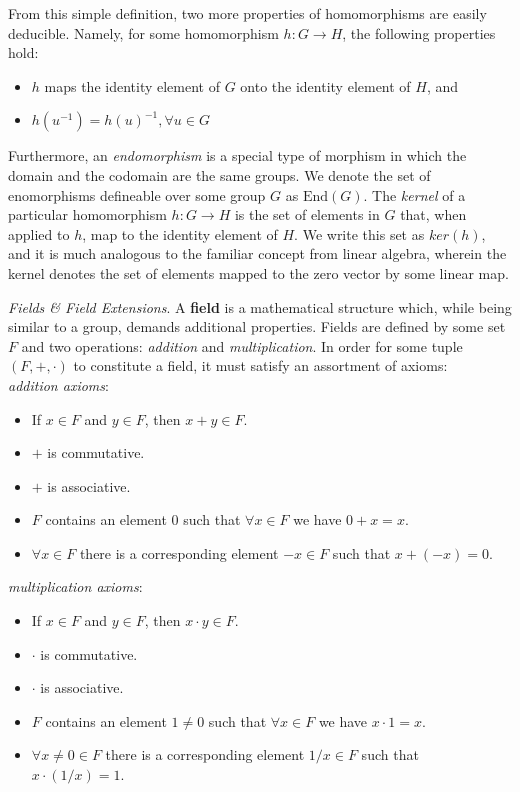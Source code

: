 From this simple definition, two more properties of homomorphisms are easily deducible. Namely, for some homomorphism $h: G \rightarrow H$, the following properties hold:
\begin{itemize}
\item $h$ maps the identity element of $G$ onto the identity element of $H$, and
\item $h(u^{-1}) = h(u)^{-1}, \forall u \in G$
\end{itemize}

Furthermore, an \emph{endomorphism} is a special type of morphism in which the domain and the codomain are the same groups. We denote the set of enomorphisms defineable over some group $G$ as $\text{End}(G)$.
The \emph{kernel} of a particular homomorphism $h: G \rightarrow H$  is the set of elements in $G$ that, when applied to $h$, map to the identity element of $H$. We write this set as $ker(h)$, and it is much analogous to the familiar concept from linear algebra, wherein the kernel denotes the set of elements mapped to the zero vector by some linear map.
\vspace{10mm}

\noindent
\emph{Fields \& Field Extensions}. A \textbf{field} is a mathematical structure which, while being similar to a group, demands additional properties. Fields are defined by some set $F$ and two operations: \emph{addition} and \emph{multiplication}. In order for some tuple $(F,+,\cdot)$ to constitute a field, it must satisfy an assortment of axioms:\\

\emph{addition axioms}:
\begin{itemize}
\item If $x \in F$ and $y \in F$, then $x + y \in F$.
\item $+$ is commutative.
\item $+$ is associative.
\item $F$ contains an element 0 such that $\forall x \in F$ we have $0 + x = x$.
\item $\forall x \in F$ there is a corresponding element $-x \in F$ such that $x + (-x) = 0$.
\end{itemize}

\emph{multiplication axioms}:
\begin{itemize}
\item If $x \in F$ and $y \in F$, then $x \cdot y \in F$.
\item $\cdot$ is commutative.
\item $\cdot$ is associative.
\item $F$ contains an element $1 \neq 0$ such that $\forall x \in F$ we have $x \cdot 1 = x$.
\item $\forall x \neq 0 \in F$ there is a corresponding element $1/x \in F$ such that $x \cdot (1/x) = 1$.
\end{itemize}

